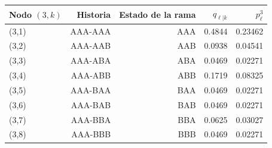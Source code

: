 {\small
\begin{tabular}{lrrrr}
\toprule
Nodo $(3,k)$ & Historia & Estado de la rama & $q_{\ell|k}$ & $p^3_\ell$ \\
\midrule
(3,1) & AAA-AAA & AAA & 0.4844 & 0.23462 \\
(3,2) & AAA-AAB & AAB & 0.0938 & 0.04541 \\
(3,3) & AAA-ABA & ABA & 0.0469 & 0.02271 \\
(3,4) & AAA-ABB & ABB & 0.1719 & 0.08325 \\
(3,5) & AAA-BAA & BAA & 0.0469 & 0.02271 \\
(3,6) & AAA-BAB & BAB & 0.0469 & 0.02271 \\
(3,7) & AAA-BBA & BBA & 0.0625 & 0.03027 \\
(3,8) & AAA-BBB & BBB & 0.0469 & 0.02271 \\
\bottomrule
\end{tabular}
}

